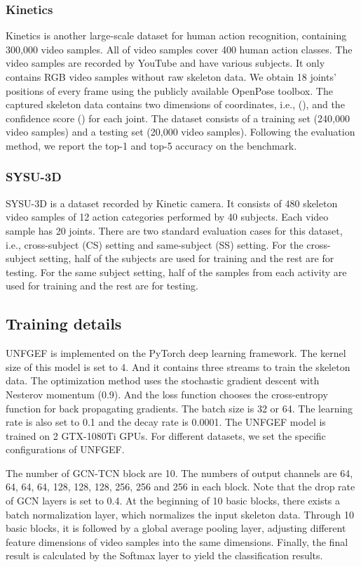 \documentclass[journal]{IEEEtran}
\begin{document}
\subsubsection{Kinetics} Kinetics is another large-scale dataset for human action recognition, containing 300,000 video samples. All of video samples cover 400 human action classes. The video samples are recorded by YouTube and have various subjects. It only contains RGB video samples without raw skeleton data. We obtain 18 joints' positions of every frame using the publicly available OpenPose toolbox. The captured skeleton data contains two dimensions of coordinates, i.e., (), and the confidence score () for each joint. The dataset consists of a training set (240,000 video samples) and a testing set (20,000 video samples). Following the evaluation method, we report the top-1 and top-5 accuracy on the benchmark.

\subsubsection{SYSU-3D} SYSU-3D is a dataset recorded by Kinetic camera. It consists of 480 skeleton video samples of 12 action categories performed by 40 subjects. Each video sample has 20 joints. There are two standard evaluation cases for this dataset, i.e., cross-subject (CS) setting and same-subject (SS) setting. For the cross-subject setting, half of the subjects are used for training and the rest are for testing. For the same subject setting, half of the samples from each activity are used for training and the rest are for testing.

\subsection{Training details}
UNFGEF is implemented on the PyTorch deep learning framework. The kernel size of this model is set to 4. And it contains three streams to train the skeleton data. The optimization method uses the stochastic gradient descent with Nesterov momentum (0.9). And the loss function chooses the cross-entropy function for back propagating gradients. The batch size is 32 or 64. The learning rate is also set to 0.1 and the decay rate is 0.0001. The UNFGEF model is trained on 2 GTX-1080Ti GPUs. For different datasets, we set the specific configurations of UNFGEF.

The number of GCN-TCN block are 10. The numbers of output channels are 64, 64, 64, 64, 128, 128, 128, 256, 256 and 256 in each block. Note that the drop rate of GCN layers is set to 0.4. At the beginning of 10 basic blocks, there exists a batch normalization layer, which normalizes the input skeleton data. Through 10 basic blocks, it is followed by a global average pooling layer, adjusting different feature dimensions of video samples into the same dimensions. Finally, the final result is calculated by the Softmax layer to yield the classification results.
\end{document}
